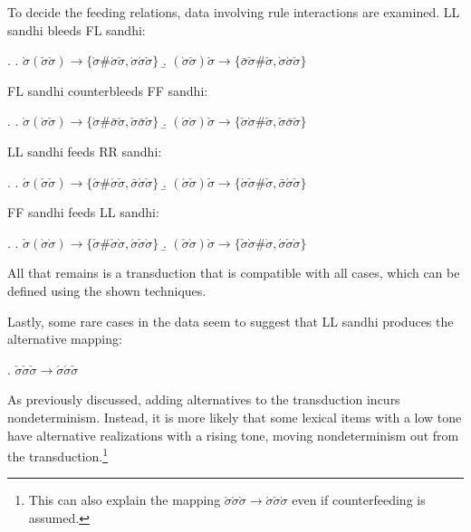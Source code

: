 \documentclass[12pt, a4paper]{report}
\begin{document}
To decide the feeding relations, data involving rule interactions are
examined.  LL sandhi bleeds FL sandhi:

\ex.
\a. \(\grave{\sigma}(\check{\sigma}\check{\sigma}) \to
\{\grave{\sigma}\#\acute{\sigma}\check{\sigma},
\grave{\sigma}\acute{\sigma}\check{\sigma}\}\)
\b. \((\grave{\sigma}\check{\sigma})\check{\sigma} \to
\{\bar{\sigma}\check{\sigma}\#\check{\sigma},
\grave{\sigma}\acute{\sigma}\check{\sigma}\}\)

FL sandhi counterbleeds FF sandhi:

\ex.
\a. \(\grave{\sigma}(\grave{\sigma}\check{\sigma}) \to
\{\grave{\sigma}\#\bar{\sigma}\check{\sigma},
\check{\sigma}\bar{\sigma}\check{\sigma}\}\)
\b. \((\grave{\sigma}\grave{\sigma})\check{\sigma} \to
\{\check{\sigma}\grave{\sigma}\#\check{\sigma},
\check{\sigma}\bar{\sigma}\check{\sigma}\}\)

LL sandhi feeds RR sandhi:

\ex.
\a. \(\acute{\sigma}(\check{\sigma}\check{\sigma}) \to
\{\acute{\sigma}\#\acute{\sigma}\check{\sigma},
\bar{\sigma}\acute{\sigma}\check{\sigma}\}\)
\b. \((\acute{\sigma}\check{\sigma})\check{\sigma} \to
\{\acute{\sigma}\check{\sigma}\#\check{\sigma},
\bar{\sigma}\acute{\sigma}\check{\sigma}\}\)

FF sandhi feeds LL sandhi:

\ex.
\a. \(\check{\sigma}(\grave{\sigma}\grave{\sigma}) \to
\{\check{\sigma}\#\check{\sigma}\grave{\sigma},
\acute{\sigma}\check{\sigma}\grave{\sigma}\}\)
\b. \((\check{\sigma}\grave{\sigma})\grave{\sigma} \to
\{\check{\sigma}\grave{\sigma}\#\grave{\sigma},
\acute{\sigma}\check{\sigma}\grave{\sigma}\}\)

All that remains is a transduction that is compatible with all cases,
which can be defined using the shown techniques.


Lastly, some rare cases in the data seem to suggest that LL sandhi
produces the alternative mapping:

\ex. \(\check{\sigma}\check{\sigma}\check{\sigma} \to
\acute{\sigma}\acute{\sigma}\check{\sigma}\)

As previously discussed, adding alternatives to the transduction
incurs nondeterminism.  Instead, it is more likely that some lexical
items with a low tone have alternative realizations with a rising
tone, moving nondeterminism out from the transduction.\footnote{This
  can also explain the mapping
  \(\check{\sigma}\grave{\sigma}\grave{\sigma} \to
  \acute{\sigma}\check{\sigma}\grave{\sigma}\) even if counterfeeding
  is assumed.}
\end{document}
